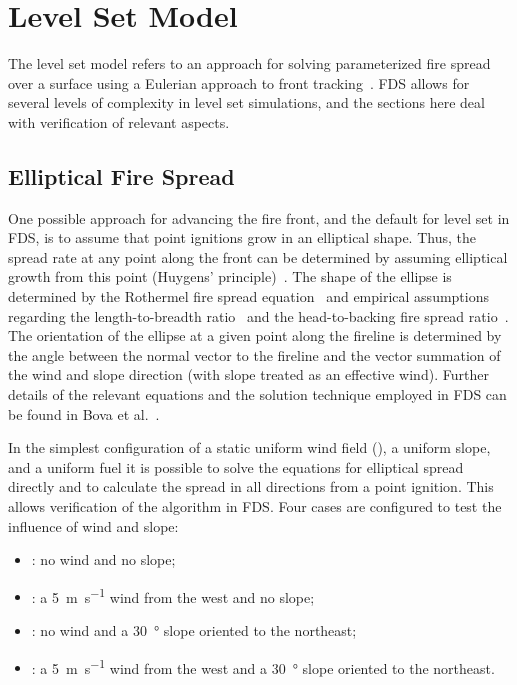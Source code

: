 \documentclass[11pt]{book}
\begin{document}
\section{Level Set Model}

The level set model refers to an approach for solving parameterized fire spread over a surface using a Eulerian approach to front tracking~\cite{Rehm:LevelSet}. FDS allows for several levels of complexity in level set simulations, and the sections here deal with verification of relevant aspects.

\subsection{Elliptical Fire Spread}
One possible approach for advancing the fire front, and the default for level set in FDS, is to assume that point ignitions grow in an elliptical shape. Thus, the spread rate at any point along the front can be determined by assuming elliptical growth from this point (Huygens' principle)~\cite{Richards:1990,Finney:FARSITE}. The shape of the ellipse is determined by the Rothermel fire spread equation~\cite{Rothermel:1972} and empirical assumptions regarding the length-to-breadth ratio~\cite{Anderson:1983} and the head-to-backing fire spread ratio~\cite{Finney:FARSITE}. The orientation of the ellipse at a given point along the fireline is determined by the angle between the normal vector to the fireline and the vector summation of the wind and slope direction (with slope treated as an effective wind). Further details of the relevant equations and the solution technique employed in FDS can be found in Bova et al.~\cite{Bova:IJWF2015}.

In the simplest configuration of a static uniform wind field (), a uniform slope, and a uniform fuel it is possible to solve the equations for elliptical spread directly and to calculate the spread in all directions from a point ignition. This allows verification of the algorithm in FDS. Four cases are configured to test the influence of wind and slope:

\begin{itemize}
  \item {}: no wind and no slope;
  \item {}: a \SI[per-mode=symbol]{5}{\meter\per\second} wind from the west and no slope;
  \item {}: no wind and a \SI{30}{\degree} slope oriented to the northeast;
  \item {}: a \SI[per-mode=symbol]{5}{\meter\per\second} wind from the west and a \SI{30}{\degree} slope oriented to the northeast.
\end{itemize}
\end{document}

